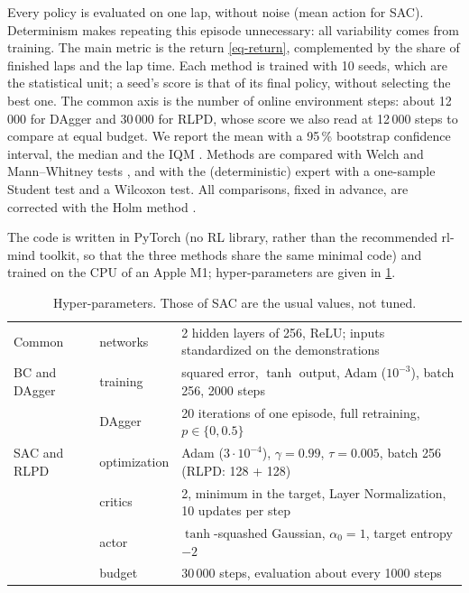 \documentclass[10pt,a4paper,english]{article}
\begin{document}
Every policy is evaluated on one lap, without noise (mean action for SAC). Determinism makes repeating this episode unnecessary: all variability comes from training. The main metric is the return \eqref{eq-return}, complemented by the share of finished laps and the lap time. Each method is trained with 10 seeds, which are the statistical unit; a seed's score is that of its final policy, without selecting the best one. The common axis is the number of online environment steps: about 12\,000 for DAgger and 30\,000 for RLPD, whose score we also read at 12\,000 steps to compare at equal budget. We report the mean with a 95\,\% bootstrap confidence interval, the median and the IQM \citep{agarwal2021rliable}. Methods are compared with Welch and Mann--Whitney tests \citep{colas2019hitchhiker}, and with the (deterministic) expert with a one-sample Student test and a Wilcoxon test. All comparisons, fixed in advance, are corrected with the Holm method \citep{holm1979simple}.

The code is written in PyTorch (no RL library, rather than the recommended rl-mind toolkit, so that the three methods share the same minimal code) and trained on the CPU of an Apple M1; hyper-parameters are given in \cref{tab-hparams}.

\begin{table}[h]
  \centering
  \small
  \caption{Hyper-parameters. Those of SAC are the usual values, not tuned.}
  \label{tab-hparams}
  \begin{tabular}{lll}
    \toprule
    Common & networks & 2 hidden layers of 256, ReLU; inputs standardized on the demonstrations \\
    BC and DAgger & training & squared error, $\tanh$ output, Adam ($10^{-3}$), batch 256, 2000 steps \\
     & DAgger & 20 iterations of one episode, full retraining, $p \in \{0, 0.5\}$ \\
    SAC and RLPD & optimization & Adam ($3 \cdot 10^{-4}$), $\gamma = 0.99$, $\tau = 0.005$, batch 256 (RLPD: 128 + 128) \\
     & critics & 2, minimum in the target, Layer Normalization, 10 updates per step \\
     & actor & $\tanh$-squashed Gaussian, $\alpha_0 = 1$, target entropy $-2$ \\
     & budget & 30\,000 steps, evaluation about every 1000 steps \\
    \bottomrule
  \end{tabular}
\end{table}
\end{document}

